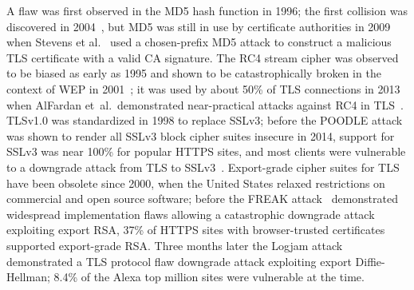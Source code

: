 A flaw was first observed in the MD5 hash function in 1996; the first collision was discovered in 2004~\cite{Wang:2005:BMO:2154598.2154601}, but MD5 was still in use by certificate authorities in 2009 when Stevens et al.~\cite{Stevens2009} used a chosen-prefix MD5 attack to construct a malicious TLS certificate with a valid CA signature. 
The RC4 stream cipher was observed to be biased as early as 1995 and shown to be catastrophically broken in the context of WEP in 2001~\cite{Fluhrer2001}; it was used by about 50\% of TLS connections in 2013 when AlFardan et~al.\ demonstrated near-practical attacks against RC4 in TLS~\cite{RC4biases}.
TLSv1.0 was standardized in 1998 to replace SSLv3; before the POODLE attack~\cite{POODLE} was shown to render all SSLv3 block cipher suites insecure in 2014, support for SSLv3 was near 100\% for popular HTTPS sites, and most clients were vulnerable to a downgrade attack from TLS to SSLv3~\cite{ssllabs}.  Export-grade cipher suites for TLS have been obsolete since 2000, when the United States relaxed restrictions on commercial and open source software; before the FREAK attack~\cite{SMACKTLS} demonstrated widespread implementation flaws allowing a catastrophic downgrade attack exploiting export RSA, 37\% of HTTPS sites with browser-trusted certificates supported export-grade RSA\@.  Three months later the Logjam attack~\cite{LogJam} demonstrated a TLS protocol flaw downgrade attack exploiting export Diffie-Hellman; 8.4\% of the Alexa top million sites were vulnerable at the time.

